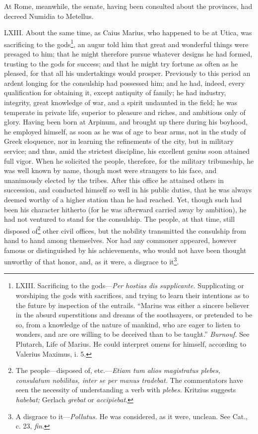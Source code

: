 At Rome, meanwhile, the senate, having been consulted about the
provinces, had decreed Numidia to Metellus.

LXIII. About the same time, as Caius Marius, who happened to be at
Utica, was sacrificing to the gods\footnote{LXIII. Sacrificing to the gods—\emph{Per hostias dis supplicante.}
Supplicating or worshiping the gods with sacrifices, and trying to
learn their intentions as to the future by inspection of the entrails.
``Marius was either a sincere believer in the absurd superstitions and
dreams of the soothsayers, or pretended to be so, from a knowledge of
the nature of mankind, who are eager to listen to wonders, and are
ore willing to be deceived than to be taught.'' \emph{Burnouf.} See Plutarch,
Life of Marius. He could interpret omens for himself, according to
Valerius Maximus, i. 5.}, an augur told him that great
and wonderful things were presaged to him; that he might therefore
pursue whatever designs he had formed, trusting to the gods for
success; and that he might try fortune as often as he pleased, for
that all his undertakings would prosper. Previously to this period an
ardent longing for the consulship had possessed him; and he had,
indeed, every qualification for obtaining it, except antiquity of
family; he had industry, integrity, great knowledge of war, and a
spirit undaunted in the field; he was temperate in private life,
superior to pleasure and riches, and ambitious only of glory.
Having been born at Arpinum, and brought up there during his boyhood,
he employed himself, as soon as he was of age to bear arms, not in the
study of Greek eloquence, nor in learning the refinements of the city,
but in military service; and thus, amid the strictest discipline, his
excellent genius soon attained full vigor. When he solicited the
people, therefore, for the military tribuneship, he was well known by
name, though most were strangers to his face, and unanimously elected
by the tribes. After this office he attained others in succession, and
conducted himself so well in his public duties, that he was always
deemed worthy of a higher station than he had reached. Yet, though
such had been his character hitherto (for he was afterward carried
away by ambition), he had not ventured to stand for the consulship.
The people, at that time, still disposed of\footnote{The people—disposed of, etc.—\emph{Etiam tum alios magistratus
plebes, consulatum nobilitas, inter se per manus tradebat.} The
commentators have seen the necessity of understanding a verb with
\emph{plebes.} Kritzius suggests \emph{habebat;} Gerlach \emph{grebat} or \emph{accipiebat}.} other civil offices,
but the nobility transmitted the consulship from hand to hand among
themselves. Nor had any commoner appeared, however famous or
distinguished by his achievements, who would not have been thought
unworthy of that honor, and, as it were, a disgrace to it\footnote{A disgrace to it—\emph{Pollutus.} He was considered, as it were,
unclean. See Cat., c. 23, \emph{fin}.}.

